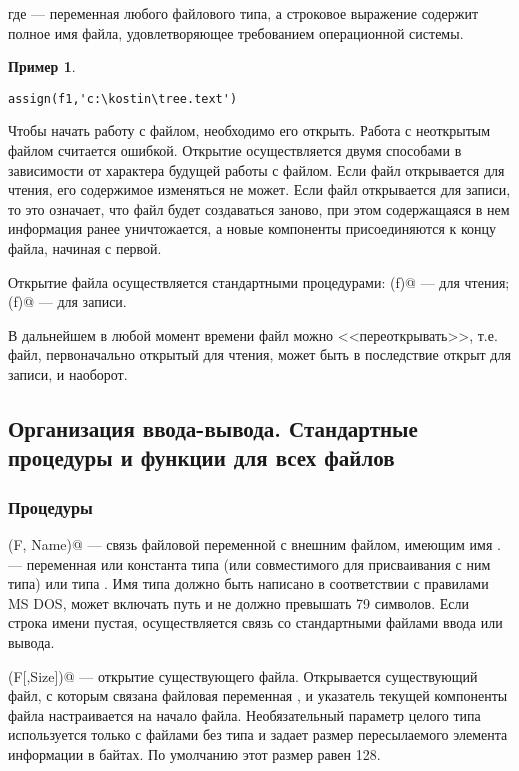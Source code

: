 \documentclass[12pt,a4paper]{article}
\theoremstyle{plain}
\theoremstyle{definition}
\newtheorem*{example}{Пример}
\theoremstyle{remark}
\begin{document}
где \verb@f@ --- переменная любого файлового типа, а строковое выражение \verb@name@ содержит полное имя файла, удовлетворяющее требованием операционной системы.

\begin{example}
~\\
\begin{verbatim}
assign(f1,'c:\kostin\tree.text')
\end{verbatim}
\end{example}

Чтобы начать работу с файлом, необходимо его открыть. Работа с неоткрытым файлом считается ошибкой. Открытие осуществляется двумя способами в зависимости от характера будущей работы с файлом. Если файл открывается для чтения, его содержимое изменяться не может. Если файл открывается для записи, то это означает, что файл будет создаваться заново, при этом содержащаяся в нем информация ранее уничтожается, а новые компоненты присоединяются к концу файла, начиная с первой.

Открытие файла осуществляется стандартными процедурами: \verb@reset(f)@ --- для чтения; \verb@rewrite(f)@ --- для записи.

В дальнейшем в любой момент времени файл можно <<переоткрывать>>, т.е. файл, первоначально открытый для чтения, может быть в последствие открыт для записи, и наоборот.

\subsection{Организация ввода-вывода. Стандартные процедуры и функции для всех файлов}
\subsubsection*{Процедуры}

\verb@Assign (F, Name)@ --- связь файловой переменной с внешним файлом, имеющим имя \verb@Name@. \verb@Name@ --- переменная или константа типа \verb@string@ (или совместимого для присваивания с ним типа) или типа . Имя типа должно быть написано в соответствии с правилами MS DOS, может включать путь и не должно превышать 79 символов. Если строка имени пустая, осуществляется связь со стандартными файлами ввода или вывода.

\verb@Reset(F[,Size])@ --- открытие существующего файла. Открывается существующий файл, с которым связана файловая переменная \verb@F@, и указатель текущей компоненты файла настраивается на начало файла. Необязательный параметр целого типа \verb@Size@ используется только с файлами без типа и задает размер пересылаемого элемента информации в байтах. По умолчанию этот размер равен 128.
\end{document}
